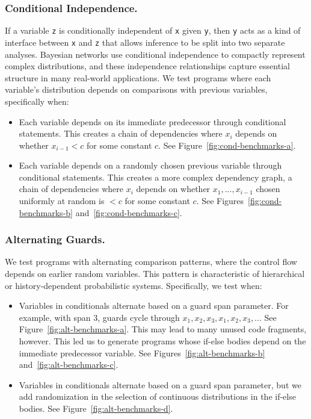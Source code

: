 \subsubsection{Conditional Independence.} 
If a variable \texttt{z} is conditionally independent of \texttt{x} given \texttt{y}, then \texttt{y} acts as a kind of interface between \texttt{x} and \texttt{z} that allows inference to be split into two separate analyses. Bayesian networks use conditional independence to compactly represent complex distributions, and these independence relationships capture essential structure in many real-world applications. We test programs where each variable's distribution depends on comparisons with previous variables, specifically when:

\begin{itemize}
\item Each variable depends on its immediate predecessor through conditional statements. This creates a chain of dependencies where $x_i$ depends on whether $x_{i-1} < c$ for some constant $c$. See Figure~\ref{fig:cond-benchmarks-a}.
\item Each variable depends on a randomly chosen previous variable through conditional statements. This creates a more complex dependency graph, a chain of dependencies where $x_i$ depends on whether $x_1, ..., x_{i-1}$ chosen uniformly at random is $< c$ for some constant $c$. See Figures~\ref{fig:cond-benchmarks-b} and~\ref{fig:cond-benchmarks-c}.
\end{itemize}



\subsubsection{Alternating Guards.}
We test programs with alternating comparison patterns,
where the control flow depends on earlier random variables. This pattern is characteristic of hierarchical or history-dependent probabilistic systems. Specifically, we test when:

\begin{itemize}
\item Variables in conditionals alternate based on a guard span parameter. For example, with span 3, guards cycle through $x_1, x_2, x_3, x_1, x_2, x_3, ...$ See Figure~\ref{fig:alt-benchmarks-a}. This may lead to many unused code fragments, however. This led us to generate programs whose if-else bodies depend on the immediate predecessor variable. See Figures~\ref{fig:alt-benchmarks-b} and~\ref{fig:alt-benchmarks-c}.

\item Variables in conditionals alternate based on a guard span parameter, but we add randomization in the selection of continuous distributions in the if-else bodies. See Figure~\ref{fig:alt-benchmarks-d}.
\end{itemize}

